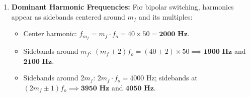 \documentclass[11pt,a4paper]{article}
\begin{document}
\begin{examplebox}
\begin{enumerate}
  \item \textbf{Dominant Harmonic Frequencies:}
  For bipolar switching, harmonics appear as sidebands centered around $m_f$ and its multiples:
  \begin{itemize}
    \item Center harmonic: $f_{m_f} = m_f \cdot f_o = 40 \times 50 = \mathbf{2000\text{ Hz}}$.
    \item Sidebands around $m_f$: $(m_f \pm 2) f_o = (40 \pm 2) \times 50 \implies \mathbf{1900\text{ Hz}}$ and $\mathbf{2100\text{ Hz}}$.
    \item Sidebands around $2m_f$: $2m_f \cdot f_o = 4000\text{ Hz}$; sidebands at $(2m_f \pm 1) f_o \implies \mathbf{3950\text{ Hz}}$ and $\mathbf{4050\text{ Hz}}$.
  \end{itemize}
\end{enumerate}
\end{examplebox}
\end{document}

